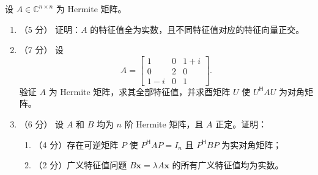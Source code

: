\documentclass[10pt,a4paper]{exam-zh}
\newcommand{\bvec}[1]{\boldsymbol{#1}}
\newcommand{\ct}{\mathsf{H}}
\newcommand{\C}{\mathbb{C}}
\begin{document}
\begin{problem}[points = 18]
设 $A \in \C^{n \times n}$ 为 Hermite 矩阵。

\begin{enumerate}
    \item （5 分） 证明：$A$ 的特征值全为实数，且不同特征值对应的特征向量正交。

    \item （7 分） 设
    \[
    A = \begin{bmatrix}
    1      & 0      & 1 + i \\
    0      & 2      & 0              \\
    1 - i & 0      & 1
    \end{bmatrix}.
    \]
    验证 $A$ 为 Hermite 矩阵，求其全部特征值，并求酉矩阵 $U$ 使 $U^\ct A U$ 为对角矩阵。

    \item （6 分） 设 $A$ 和 $B$ 均为 $n$ 阶 Hermite 矩阵，且 $A$ 正定。证明：
    \begin{enumerate}
        \item （4 分）存在可逆矩阵 $P$ 使 $P^\ct A P = I_n$ 且 $P^\ct B P$ 为实对角矩阵；
        \item （2 分）广义特征值问题 $B\bvec{x} = \lambda A \bvec{x}$ 的所有广义特征值均为实数。
    \end{enumerate}
\end{enumerate}
\end{problem}
\end{document}
